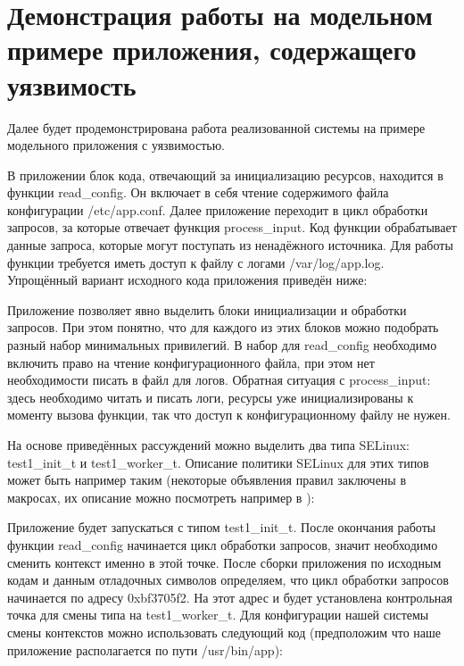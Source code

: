 \newpage
\section{Демонстрация работы на модельном примере приложения,
                содержащего уязвимость}

Далее будет продемонстрирована работа реализованной системы на примере
модельного приложения с уязвимостью. 

В приложении блок кода, отвечающий за инициализацию ресурсов, находится
в функции read\_config. Он включает в себя чтение содержимого файла
конфигурации /etc/app.conf. Далее приложение переходит в цикл обработки
запросов, за которые отвечает функция process\_input. Код функции
обрабатывает данные запроса, которые могут поступать из ненадёжного
источника. Для работы функции требуется иметь доступ к файлу с логами
/var/log/app.log.  Упрощённый вариант исходного кода приложения приведён
ниже: 



Приложение позволяет явно выделить блоки инициализации и обработки
запросов. При этом понятно, что для каждого из этих блоков можно
подобрать разный набор минимальных привилегий. В набор для read\_config
необходимо включить право на чтение конфигурационного файла, при этом
нет необходимости писать в файл для логов. Обратная ситуация с
process\_input: здесь необходимо читать и писать логи, ресурсы уже
инициализированы к моменту вызова функции, так что доступ к
конфигурационному файлу не нужен. 

На основе приведённых рассуждений можно выделить два типа SELinux:
test1\_init\_t и test1\_worker\_t. Описание политики SELinux для этих
типов может быть например таким (некоторые объявления правил заключены в
макросах, их описание можно посмотреть например в \cite{SEOF}):



Приложение будет запускаться с типом test1\_init\_t. После окончания
работы функции read\_config начинается цикл обработки запросов, значит
необходимо сменить контекст именно в этой точке. После сборки приложения
по исходным кодам и данным отладочных символов определяем, что цикл
обработки запросов начинается по адресу 0xbf3705f2.  На этот адрес и
будет установлена контрольная точка для смены типа на test1\_worker\_t. Для
конфигурации нашей системы смены контекстов можно использовать следующий
код (предположим что наше приложение располагается по пути
/usr/bin/app):


